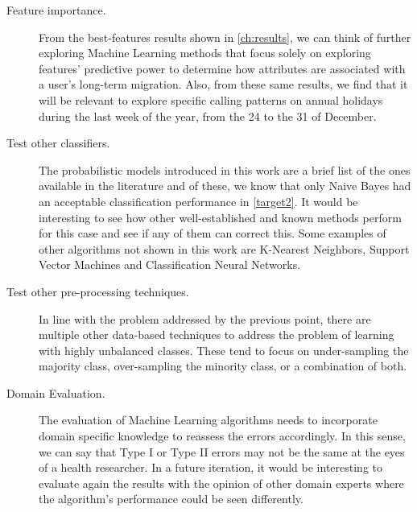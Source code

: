 \begin{description}
    \item [Feature importance.] From the best-features results shown in \cref{ch:results}, we can think of further exploring Machine Learning methods that focus solely on exploring features' predictive power to determine how attributes are associated with a user's long-term migration.
    Also, from these same results, we find that it will be relevant to explore specific calling patterns on annual holidays during the last week of the year, from the 24 to the 31 of December.

    \item [Test other classifiers.] The probabilistic models introduced in this work are a brief list of the ones available in the literature and of these, we know that only Naive Bayes had an acceptable classification performance in \cref{target2}.
    It would be interesting to see how other well-established and known methods perform for this case and see if any of them can correct this.
    Some examples of other algorithms not shown in this work are K-Nearest Neighbors, Support Vector Machines and Classification Neural Networks.

    \item [Test other pre-processing techniques.] In line with the problem addressed by the previous point, there are multiple other data-based techniques to address the problem of learning with highly unbalanced classes.
    These tend to focus on under-sampling the majority class, over-sampling the minority class, or a combination of both.


    \item [Domain Evaluation.] The evaluation of Machine Learning algorithms needs to incorporate domain specific knowledge to reassess the errors accordingly. In this sense, we can say that Type I or Type II errors may not be the same at the eyes of a health researcher.
    In a future iteration, it would be interesting to evaluate again the results with the opinion of other domain experts where the algorithm's performance could be seen differently.

\end{description}

